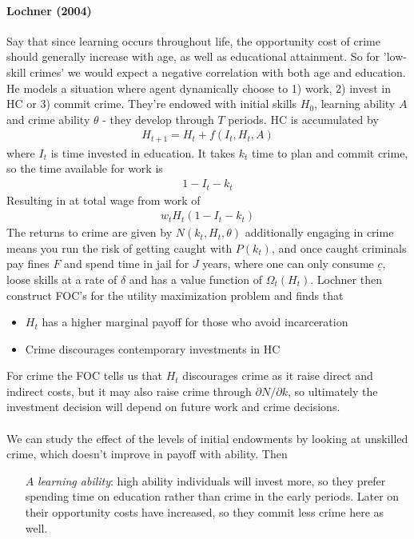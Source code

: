 \documentclass[12pt, a4paper]{article}
\begin{document}
\begin{multicols}{2}
\paragraph{Lochner (2004)} Say that since learning occurs throughout life, the opportunity cost of crime should generally increase with age, as well as educational attainment. So for 'low-skill crimes' we would expect a negative correlation with both age and education. He models a situation where agent dynamically choose to 1) work, 2) invest in HC or 3) commit crime. They're endowed with initial skills $H_0$, learning ability $A$ and crime ability $\theta$ - they develop through $T$ periods. HC is accumulated by
\begin{align*}
H_{t+1} = H_t + f(I_t, H_t, A)
\end{align*}
where $I_t$ is time invested in education. It takes $k_t$ time to plan and commit crime, so the time available for work is
\begin{align*}
1-I_t - k_t
\end{align*}
Resulting in at total wage from work of
\begin{align*}
w_t H_t (1- I_t - k_t)
\end{align*}
The returns to crime are given by $N(k_t, H_t, \theta)$ additionally engaging in crime means you run the risk of getting caught with $P(k_t)$, and once caught criminals pay fines $F$ and spend time in jail for $J$ years, where one can only consume $\underline{c}$, loose skills at a rate of $\delta$ and has a value function of $\Omega_t(H_t)$. Lochner then construct FOC's for the utility maximization problem and finds that
\begin{itemize}
\item $H_t$ has a higher marginal payoff for those who avoid incarceration
\item Crime discourages contemporary investments in HC
\end{itemize}
For crime the FOC tells us that $H_t$ discourages crime as it raise direct and indirect costs, but it may also raise crime through $\partial N / \partial k$, so ultimately the investment decision will depend on future work and crime decisions.
\\ \\
We can study the effect of the levels of initial endowments by looking at unskilled crime, which doesn't improve in payoff with ability. Then
\begin{itemize}
\item[$A$] \textit{learning ability}: high ability individuals will invest more, so they prefer spending time on education rather than crime in the early periods. Later on their opportunity costs have increased, so they commit less crime here as well.

\end{itemize}
\end{multicols}
\end{document}
